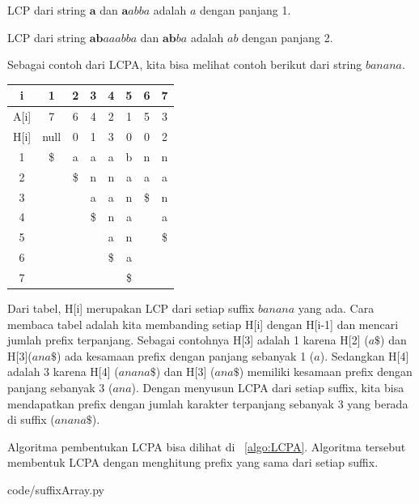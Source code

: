 LCP dari string $\textbf{a}$ dan $\textbf{a}abba$ adalah $a$ dengan panjang 1.

LCP dari string $\textbf{ab}aaabba$ dan $\textbf{ab}ba$ adalah $ab$ dengan panjang 2.

Sebagai contoh dari LCPA, kita bisa melihat contoh berikut dari string $banana$.


\begin{center}
  \begin{tabular}{ | c | c | c |c | c | c | c | c | }
    \hline
    i	& 1	& 2	& 3	& 4	& 5	& 6	& 7 \\ \hline
		A[i]	& 7	& 6	& 4	& 2	& 1	& 5	& 3 \\ \hline
		H[i]	& null	& 0 & 1 &	3 & 0 & 0 & 2 \\ \hline
		1	& \$	& a	& a	& a	& b	& n	& n \\ \hline
		2	& & \$	& n	& n	& a	& a	& a \\ \hline
		3	& & & a	& a	& n	& \$	& n \\ \hline
		4	& & & \$	& n	& a	& & a \\ \hline
		5 & & & & a	& n	& & \$ \\ \hline
		6	& & & & \$ & a	& & \\ \hline
		7	& & & & & \$ & &  \\ 
    \hline
  \end{tabular}
\end{center}

Dari tabel, H[i] merupakan LCP dari setiap suffix $banana$ yang ada. Cara membaca tabel adalah kita membanding setiap H[i] dengan H[i-1] dan mencari jumlah prefix terpanjang. Sebagai contohnya H[3] adalah 1 karena H[2] ($a\$$) dan H[3]($ana\$$) ada kesamaan prefix dengan panjang sebanyak 1 ($a$). Sedangkan H[4] adalah 3 karena H[4] ($anana\$$) dan H[3] ($ana\$$) memiliki kesamaan prefix dengan panjang sebanyak 3 ($ana$). Dengan menyusun LCPA dari setiap suffix, kita bisa mendapatkan prefix dengan jumlah karakter terpanjang sebanyak 3 yang berada di suffix ($anana\$$).

Algoritma pembentukan LCPA bisa dilihat di ~\ref{algo:LCPA}. Algoritma tersebut membentuk LCPA dengan menghitung prefix yang sama dari setiap suffix.


                {code/suffixArray.py}

